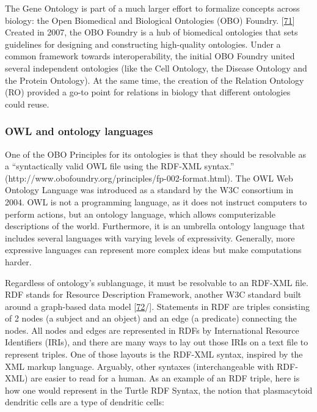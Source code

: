 The Gene Ontology is part of a much larger effort to formalize concepts across biology: the Open Biomedical and Biological Ontologies (OBO) Foundry. {[}\protect\hyperlink{ref-j3tJyG7J}{71}{]}
Created in 2007, the OBO Foundry is a hub of biomedical ontologies that sets guidelines for designing and constructing high-quality ontologies.
Under a common framework towards interoperability, the initial OBO Foundry united several independent ontologies (like the Cell Ontology, the Disease Ontology and the Protein Ontology).
At the same time, the creation of the Relation Ontology (RO) provided a go-to point for relations in biology that different ontologies could reuse.

\hypertarget{owl-and-ontology-languages}{%
\subsubsection{OWL and ontology languages}\label{owl-and-ontology-languages}}

One of the OBO Principles for its ontologies is that they should be resolvable as a ``syntactically valid OWL file using the RDF-XML syntax.'' (http://www.obofoundry.org/principles/fp-002-format.html).
The OWL Web Ontology Language was introduced as a standard by the W3C consortium in 2004.
OWL is not a programming language, as it does not instruct computers to perform actions, but an ontology language, which allows computerizable descriptions of the world.
Furthermore, it is an umbrella ontology language that includes several languages with varying levels of expressivity.
Generally, more expressive languages can represent more complex ideas but make computations harder.

Regardless of ontology's sublanguage, it must be resolvable to an RDF-XML file.
RDF stands for Resource Description Framework, another W3C standard built around a graph-based data model {[}\protect\hyperlink{ref-djVboz3w}{72}/{]}.
Statements in RDF are triples consisting of 2 nodes (a subject and an object) and an edge (a predicate) connecting the nodes.
All nodes and edges are represented in RDFs by International Resource Identifiers (IRIs), and there are many ways to lay out those IRIs on a text file to represent triples.
One of those layouts is the RDF-XML syntax, inspired by the XML markup language.
Arguably, other syntaxes (interchangeable with RDF-XML) are easier to read for a human.
As an example of an RDF triple, here is how one would represent in the Turtle RDF Syntax, the notion that plasmacytoid dendritic cells are a type of dendritic cells:

